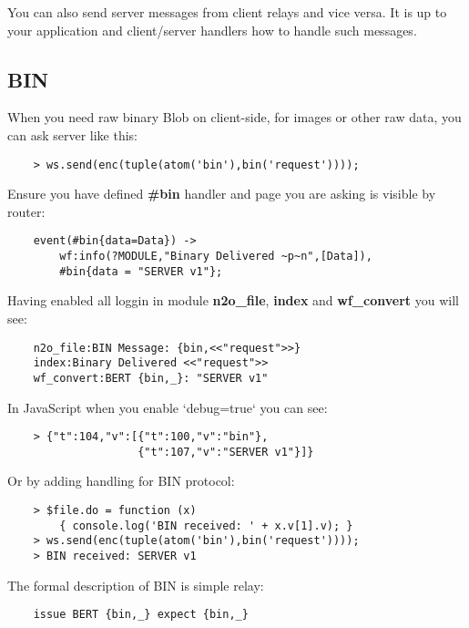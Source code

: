 You can also send server messages from client relays and vice versa.
It is up to your application and client/server handlers how to handle such messages.

\newpage
\subsection{BIN}

When you need raw binary Blob on client-side,
for images or other raw data, you can ask server like this:

\vspace{1\baselineskip}
\begin{lstlisting}
    > ws.send(enc(tuple(atom('bin'),bin('request'))));
\end{lstlisting}
\vspace{1\baselineskip}

Ensure you have defined {\bf \#bin} handler and page you are
asking is visible by router:

\vspace{1\baselineskip}
\begin{lstlisting}
    event(#bin{data=Data}) ->
        wf:info(?MODULE,"Binary Delivered ~p~n",[Data]),
        #bin{data = "SERVER v1"};
\end{lstlisting}
\vspace{1\baselineskip}

Having enabled all loggin in module {\bf n2o\_file}, {\bf index} and {\bf wf\_convert}
you will see:

\vspace{1\baselineskip}
\begin{lstlisting}
    n2o_file:BIN Message: {bin,<<"request">>}
    index:Binary Delivered <<"request">>
    wf_convert:BERT {bin,_}: "SERVER v1"
\end{lstlisting}
\vspace{1\baselineskip}

In JavaScript when you enable `debug=true` you can see:

\vspace{1\baselineskip}
\begin{lstlisting}
    > {"t":104,"v":[{"t":100,"v":"bin"},
                    {"t":107,"v":"SERVER v1"}]}
\end{lstlisting}
\vspace{1\baselineskip}

Or by adding handling for BIN protocol:

\begin{lstlisting}
    > $file.do = function (x)
        { console.log('BIN received: ' + x.v[1].v); }
    > ws.send(enc(tuple(atom('bin'),bin('request'))));
    > BIN received: SERVER v1
\end{lstlisting}
\vspace{1\baselineskip}

The formal description of BIN is simple relay:

\begin{lstlisting}
    issue BERT {bin,_} expect {bin,_}
\end{lstlisting}
